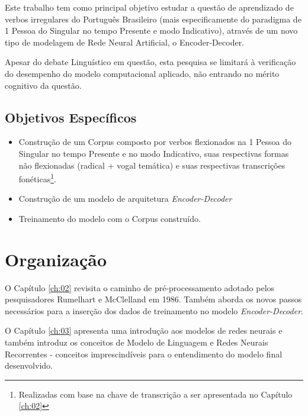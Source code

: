 Este trabalho tem como principal objetivo estudar a questão de aprendizado de verbos irregulares do Português Brasileiro (mais especificamente do paradigma de 1 Pessoa do Singular no tempo Presente e modo Indicativo), através de um novo tipo de modelagem de Rede Neural Artificial, o Encoder-Decoder. 

Apesar do debate Linguístico em questão, esta pesquisa se limitará à verificação do desempenho do modelo computacional aplicado, não entrando no mérito cognitivo da questão.


\subsection{Objetivos Específicos}

\begin{itemize}
    \item Construção de um Corpus composto por verbos flexionados na 1 Pessoa do Singular no tempo Presente e no modo Indicativo, suas respectivas formas não flexionadas (radical + vogal temática) e suas respectivas transcrições fonéticas\footnote{Realizadas com base na chave de transcrição a ser apresentada no Capítulo \ref{ch:02}}.
    \item Construção de um modelo de arquitetura \textit{Encoder-Decoder}
    \item Treinamento do modelo com o Corpus construído.
\end{itemize}



\section{Organização}
\label{sec:organization}

O Capítulo \ref{ch:02} revisita o caminho de pré-processamento adotado pelos pesquisadores Rumelhart e McClelland em 1986. Também aborda os novos passos necessários para a inserção dos dados de treinamento no modelo \textit{Encoder-Decoder}. 

O Capítulo \ref{ch:03} apresenta uma introdução aos modelos de redes neurais e também introduz os conceitos de Modelo de Linguagem e Redes Neurais Recorrentes - conceitos imprescindíveis para o entendimento do modelo final desenvolvido.

